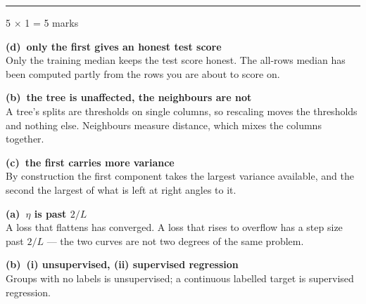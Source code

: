 \documentclass[10pt,a4paper]{article}
\newcommand{\parthead}[2]{\vspace{2pt}\noindent\rule{\linewidth}{0.4pt}\par\vspace{2pt}%
  \noindent{\bfseries Part #1}\hfill{\small #2}\par\vspace{1pt}}
\newcommand{\sol}[1]{\textbf{#1}}
\begin{document}
\noindent{}
\vspace{3pt}


\parthead{A --- Multiple choice}{5 $\times$ 1 = 5 marks}

\begin{sA}

  \item \sol{(d)\ only the first gives an honest test score}\\ Only the training median keeps the test score honest. The all-rows median has been computed partly from the rows you are about to score on.

  \item \sol{(b)\ the tree is unaffected, the neighbours are not}\\ A tree's splits are thresholds on single columns, so rescaling moves the thresholds and nothing else. Neighbours measure distance, which mixes the columns together.

  \item \sol{(c)\ the first carries more variance}\\ By construction the first component takes the largest variance available, and the second the largest of what is left at right angles to it.

  \item \sol{(a)\ $\eta$ is past $2/L$}\\ A loss that flattens has converged. A loss that rises to overflow has a step size past $2/L$ --- the two curves are not two degrees of the same problem.

  \item \sol{(b)\ (i) unsupervised, (ii) supervised regression}\\ Groups with no labels is unsupervised; a continuous labelled target is supervised regression.

\end{sA}
\end{document}
